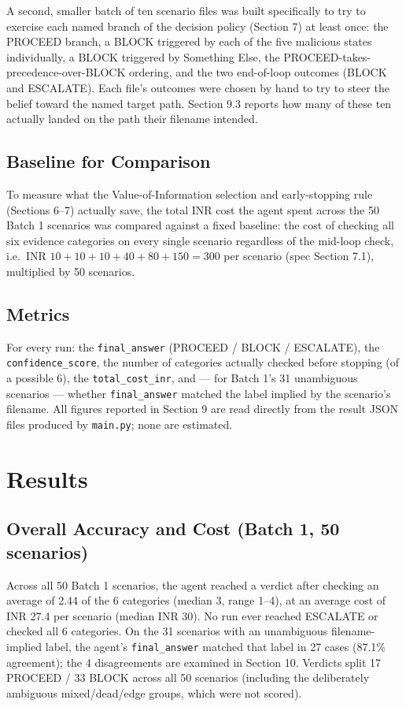 \documentclass[11pt]{article}
\begin{document}
A second, smaller batch of ten scenario files was built specifically to try to exercise each named branch of the decision policy (Section 7) at least once: the PROCEED branch, a BLOCK triggered by each of the five malicious states individually, a BLOCK triggered by Something Else, the PROCEED-takes-precedence-over-BLOCK ordering, and the two end-of-loop outcomes (BLOCK and ESCALATE). Each file's outcomes were chosen by hand to try to steer the belief toward the named target path. Section 9.3 reports how many of these ten actually landed on the path their filename intended.

\subsection{Baseline for Comparison}

To measure what the Value-of-Information selection and early-stopping rule (Sections 6--7) actually save, the total INR cost the agent spent across the 50 Batch 1 scenarios was compared against a fixed baseline: the cost of checking all six evidence categories on every single scenario regardless of the mid-loop check, i.e.\ INR $10+10+10+40+80+150=300$ per scenario (spec Section 7.1), multiplied by 50 scenarios.

\subsection{Metrics}

For every run: the \texttt{final\_answer} (PROCEED / BLOCK / ESCALATE), the \texttt{confidence\_score}, the number of categories actually checked before stopping (of a possible 6), the \texttt{total\_cost\_inr}, and --- for Batch 1's 31 unambiguous scenarios --- whether \texttt{final\_answer} matched the label implied by the scenario's filename. All figures reported in Section 9 are read directly from the result JSON files produced by \texttt{main.py}; none are estimated.

\section{Results}

\subsection{Overall Accuracy and Cost (Batch 1, 50 scenarios)}

Across all 50 Batch 1 scenarios, the agent reached a verdict after checking an average of 2.44 of the 6 categories (median 3, range 1--4), at an average cost of INR 27.4 per scenario (median INR 30). No run ever reached ESCALATE or checked all 6 categories. On the 31 scenarios with an unambiguous filename-implied label, the agent's \texttt{final\_answer} matched that label in 27 cases (87.1\% agreement); the 4 disagreements are examined in Section 10. Verdicts split 17 PROCEED / 33 BLOCK across all 50 scenarios (including the deliberately ambiguous mixed/dead/edge groups, which were not scored).
\end{document}
